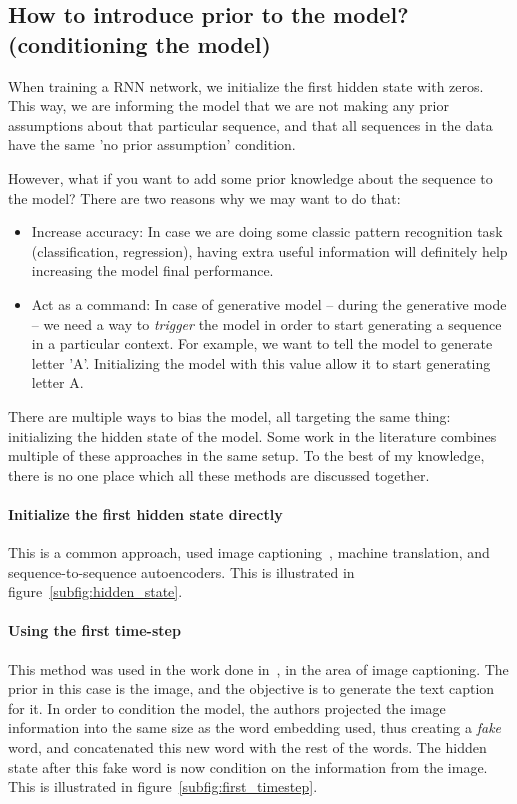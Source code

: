 \subsection{How to introduce prior to the model? (conditioning the model)}
\par When training a RNN network, we initialize the first hidden state with zeros. This way, we are informing the model that we are not making any prior assumptions about that particular sequence, and that all sequences in the data have the same 'no prior assumption' condition.

\par However, what if you want to add some prior knowledge about the sequence to the model? There are two reasons why we may want to do that:
\begin{itemize}
    \item Increase accuracy: In case we are doing some classic pattern recognition task (classification, regression), having extra useful information will definitely help increasing the model final performance.
    \item Act as a command: In case of generative model -- during the generative mode -- we need a way to \textit{trigger} the model in order to start generating a sequence in a particular context. For example, we want to tell the model to generate letter 'A'.  Initializing the model with this value allow it to start generating letter A.
\end{itemize}

There are multiple ways to bias the model, all targeting the same thing: initializing the hidden state of the model. Some work in the literature combines multiple of these approaches in the same setup. To the best of my knowledge, there is no one place which all these methods are discussed together.

\paragraph{Initialize the first hidden state directly} This is a common approach, used image captioning~\citep{karpathy2015deep}, machine translation, and sequence-to-sequence autoencoders. This is illustrated in figure~\ref{subfig:hidden_state}.

\paragraph{Using the first time-step} This method was used in the work done in~\citep{vinyals2015show}, in the area of image captioning. The prior in this case is the image, and the objective is to generate the text caption for it. In order to condition the model, the authors projected the image information into the same size as the word embedding used, thus creating a \textit{fake} word, and concatenated this new word with the rest of the words. The hidden state after this fake word is now condition on the information from the image. This is illustrated in figure~\ref{subfig:first_timestep}.

